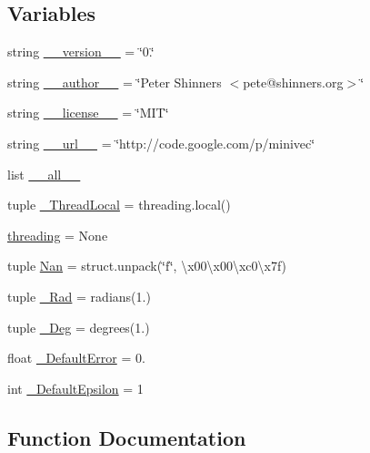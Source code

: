 \subsection*{Variables}
\begin{DoxyCompactItemize}
\item 
string \hyperlink{namespaceminivec_1_1minivec_a664310998bc3f9f64caefde4176331b3}{\+\_\+\+\_\+version\+\_\+\+\_\+} = \char`\"{}0.\char`\"{}
\item 
string \hyperlink{namespaceminivec_1_1minivec_ab8c40fffebf0c6ede3ef55861cfe4926}{\+\_\+\+\_\+author\+\_\+\+\_\+} = \char`\"{}Peter Shinners $<$pete@shinners.\+org$>$\char`\"{}
\item 
string \hyperlink{namespaceminivec_1_1minivec_a02847a23f8377584f9fb1f81c88e4dd0}{\+\_\+\+\_\+license\+\_\+\+\_\+} = \char`\"{}M\+I\+T\char`\"{}
\item 
string \hyperlink{namespaceminivec_1_1minivec_a42d6bb912b5c046963cac5e9e34bc9be}{\+\_\+\+\_\+url\+\_\+\+\_\+} = \char`\"{}http\+://code.\+google.\+com/p/minivec\char`\"{}
\item 
list \hyperlink{namespaceminivec_1_1minivec_aee6940c00f81893fa47f68748cb8baa7}{\+\_\+\+\_\+all\+\_\+\+\_\+}
\item 
tuple \hyperlink{namespaceminivec_1_1minivec_a691948dad66644e76fcdfb576b7b01f2}{\+\_\+\+Thread\+Local} = threading.\+local()
\item 
\hyperlink{namespaceminivec_1_1minivec_acbf0347ca8872c1c7a543ef36a0bf52f}{threading} = None
\item 
tuple \hyperlink{namespaceminivec_1_1minivec_abf368b58aaa6bad7fa2c6f4100f5eefe}{Nan} = struct.\+unpack(\char`\"{}f\char`\"{}, \textquotesingle{}\textbackslash{}x00\textbackslash{}x00\textbackslash{}xc0\textbackslash{}x7f\textquotesingle{})
\item 
tuple \hyperlink{namespaceminivec_1_1minivec_ae5b62e1c8439d519f00ee982428624e1}{\+\_\+\+Rad} = radians(1.)
\item 
tuple \hyperlink{namespaceminivec_1_1minivec_a5b26c80dbd4b8509096773b210c87c77}{\+\_\+\+Deg} = degrees(1.)
\item 
float \hyperlink{namespaceminivec_1_1minivec_abd8832f7f104b13c5d28376147a2fe9a}{\+\_\+\+Default\+Error} = 0.
\item 
int \hyperlink{namespaceminivec_1_1minivec_a1bcde851e3506a674b3fcd4d4087bc09}{\+\_\+\+Default\+Epsilon} = 1
\end{DoxyCompactItemize}


\subsection{Function Documentation}
\hypertarget{namespaceminivec_1_1minivec_afb2a679445010304189adfadaf5afbb3}{}
